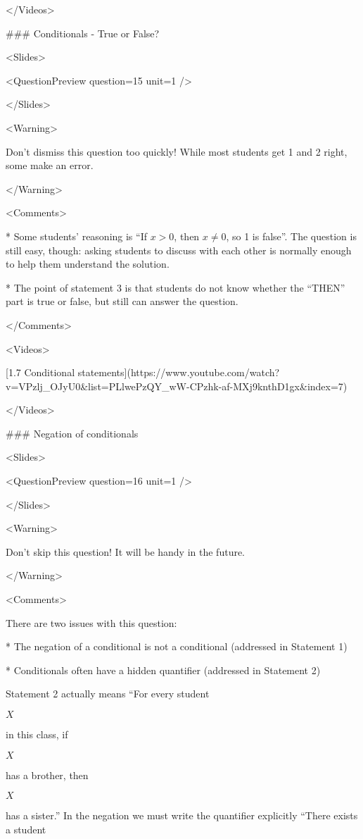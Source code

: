 </Videos>

### Conditionals - True or False?

<Slides>

<QuestionPreview question={15} unit={1} />

</Slides>

<Warning>

Don’t dismiss this question too quickly! While most students get 1 and 2 right, some make an error.

</Warning>

<Comments>

*   Some students’ reasoning is “If $x>0$, then $x \neq 0$, so 1 is false”. The question is still easy, though: asking students to discuss with each other is normally enough to help them understand the solution.

*   The point of statement 3 is that students do not know whether the “THEN” part is true or false, but still can answer the question.

</Comments>

<Videos>

[1.7 Conditional statements](https://www.youtube.com/watch?v=VPzlj_OJyU0\&list=PLlwePzQY_wW-CPzhk-af-MXj9knthD1gx\&index=7)

</Videos>

### Negation of conditionals

<Slides>

<QuestionPreview question={16} unit={1} />

</Slides>

<Warning>

Don’t skip this question! It will be handy in the future.

</Warning>

<Comments>

There are two issues with this question:

*   The negation of a conditional is not a conditional (addressed in Statement 1)

*   Conditionals often have a hidden quantifier (addressed in Statement 2)

Statement 2 actually means “For every student

$X$

in this class, if

$X$

has a brother, then

$X$

has a sister.” In the negation we must write the quantifier explicitly “There exists a student

